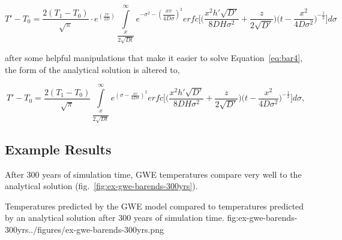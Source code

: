 \begin{equation}
	T' - T_0 = \dfrac{2 \left( T_1 - T_0 \right)}{\sqrt{\pi}} \cdot e^{\left( \displaystyle{ \frac{x v}{2D} } \right)} {\displaystyle \int\limits_{\dfrac{x}{2 \sqrt{Dt}}}^{\infty} e^{-\sigma^2 - \left( \dfrac{xv}{4D\sigma} \right)^2} erfc \Biggl[ \biggl( \dfrac{x^2 h' \sqrt{D'}}{8DH \sigma^2} + \dfrac{z}{2 \sqrt{D'}} \biggr) \biggl( t - \dfrac{x^2}{4D \sigma^2} \biggr)^{-\frac{1}{2}} \Biggr] d\sigma }
	\label{eq:bar4}
\end{equation}

after some helpful manipulations that make it easier to solve Equation~\ref{eq:bar4}, the form of the analytical solution is altered to,

\begin{equation}
  T' - T_0 = \dfrac{2 \left( T_1 - T_0 \right)}{\sqrt{\pi}} {\displaystyle \int\limits_{\dfrac{x}{2 \sqrt{Dt}}}^{\infty} e^{\displaystyle{ \left( \sigma - \frac{x v}{4 D \sigma} \right)^2}} erfc \Biggl[ \biggl( \dfrac{x^2 h' \sqrt{D'}}{8DH \sigma^2} + \dfrac{z}{2 \sqrt{D'}} \biggr) \biggl( t - \dfrac{x^2}{4D \sigma^2} \biggr)^{-\frac{1}{2}} \Biggr] d\sigma },
	\label{eq:bar-alt}
\end{equation}


\subsection{Example Results}

After 300 years of simulation time, \mf GWE temperatures compare very well to the analytical solution (fig.~\ref{fig:ex-gwe-barends-300yrs}). 

\begin{StandardFigure}{
    Temperatures predicted by the \mf GWE model compared to temperatures predicted by an analytical solution after 300 years of simulation time.}
    {fig:ex-gwe-barends-300yrs}{../figures/ex-gwe-barends-300yrs.png}
\end{StandardFigure}



